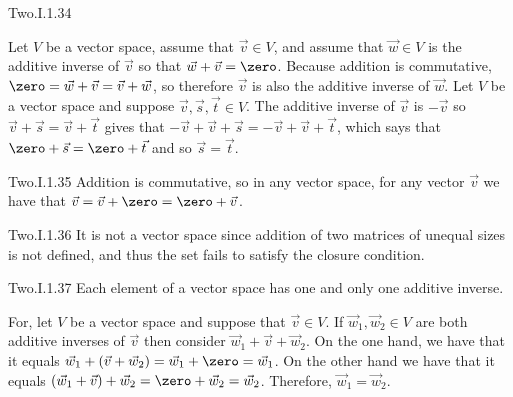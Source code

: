 \begin{ans}{Two.I.1.34}
      \begin{exparts}
        \partsitem Let \( V \) be a vector space,
          assume that \( \vec{v}\in V \), and
          assume that \( \vec{w}\in V \) is the additive inverse of $\vec{v}$
          so that \( \vec{w}+\vec{v}=\zero \).
          Because addition is commutative,
          \( \zero=\vec{w}+\vec{v}=\vec{v}+\vec{w} \),
          so therefore \( \vec{v} \) is also
          the additive inverse of \( \vec{w} \).
        \partsitem Let \( V \) be a vector space and suppose
          \( \vec{v},\vec{s},\vec{t}\in V \).
          The additive inverse of \( \vec{v} \) is \( -\vec{v} \) so
          \( \vec{v}+\vec{s}=\vec{v}+\vec{t} \) gives that
          \( -\vec{v}+\vec{v}+\vec{s}=-\vec{v}+\vec{v}+\vec{t} \),
          which says that \( \zero+\vec{s}=\zero+\vec{t} \) and so
          \( \vec{s}=\vec{t} \).
      \end{exparts}
     
\end{ans}
\begin{ans}{Two.I.1.35}
      Addition is commutative, so in any vector space,
      for any vector \( \vec{v} \) we have that
      \( \vec{v}=\vec{v}+\zero=\zero+\vec{v} \).
    
\end{ans}
\begin{ans}{Two.I.1.36}
      It is not a vector space since addition of two matrices of unequal
      sizes is not defined, and thus the set fails to satisfy the closure
      condition.
    
\end{ans}
\begin{ans}{Two.I.1.37}
      Each element of a vector space has one and only one additive
      inverse.

      For, let \( V \) be a vector space and suppose that \( \vec{v}\in V \).
      If \( \vec{w}_1,\vec{w}_2\in V \) are both additive inverses of
      \( \vec{v} \) then consider \( \vec{w}_1+\vec{v}+\vec{w}_2 \).
      On the one hand, we have that it equals $\vec{w}_1+(\vec{v}+\vec{w}_2)=
      \vec{w}_1+\zero=\vec{w}_1$.
      On the other hand we have that it equals $(\vec{w}_1+\vec{v})+\vec{w}_2=
      \zero+\vec{w}_2=\vec{w}_2$.
      Therefore, $\vec{w}_1=\vec{w}_2$.
    
\end{ans}
